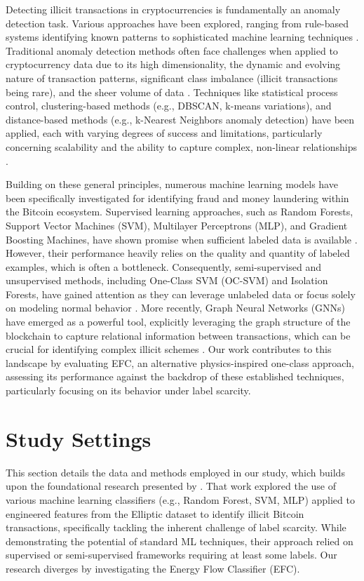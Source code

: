 \documentclass[12pt]{article}
\begin{document}
Detecting illicit transactions in cryptocurrencies is fundamentally an anomaly detection task. Various approaches have been 
explored, ranging from rule-based systems identifying known patterns to sophisticated machine learning techniques \cite{samariya2023comprehensive, li2023survey}.
Traditional anomaly detection methods often face challenges when applied to cryptocurrency data due to its high dimensionality,
the dynamic and evolving nature of transaction patterns, significant class imbalance (illicit transactions being rare), and
the sheer volume of data \cite{pallathadka2022cryptocurrency}. Techniques like statistical process control,
clustering-based methods (e.g., DBSCAN, k-means variations), and distance-based methods (e.g., k-Nearest Neighbors anomaly detection)
have been applied, each with varying degrees of success and limitations, particularly concerning scalability and the ability
to capture complex, non-linear relationships \cite{hilal2022financial}.

Building on these general principles, numerous machine learning models have been specifically investigated for identifying
fraud and money laundering within the Bitcoin ecosystem. Supervised learning approaches, such as Random Forests, Support
Vector Machines (SVM), Multilayer Perceptrons (MLP), and Gradient Boosting Machines, have shown promise when sufficient
labeled data is available \cite{lorenz2021machinelearningmethodsdetect, chen2021bitcoin}. However,
their performance heavily relies on the quality and quantity of labeled examples, which is often a bottleneck. Consequently,
semi-supervised and unsupervised methods, including One-Class SVM (OC-SVM) and Isolation Forests, have gained attention
as they can leverage unlabeled data or focus solely on modeling normal behavior \cite{lorenz2021machinelearningmethodsdetect,
kehinde2024machine}.
More recently, Graph Neural Networks (GNNs) have emerged as a powerful tool, explicitly leveraging the graph structure of
the blockchain to capture relational information between transactions, which can be crucial for identifying complex illicit
schemes \cite{weber2019antimoneylaunderingbitcoinexperimenting}. Our work contributes to this
landscape by evaluating EFC, an alternative physics-inspired one-class approach, assessing its performance against the
backdrop of these established techniques, particularly focusing on its behavior under label scarcity.


\section{Study Settings} \label{sec:methods}
This section details the data and methods employed in our study, which builds upon the foundational research presented
by \cite{lorenz2021machinelearningmethodsdetect}. That work explored the use of various machine learning classifiers
(e.g., Random Forest, SVM, MLP) applied to engineered features from the Elliptic dataset to identify illicit Bitcoin transactions,
specifically tackling the inherent challenge of label scarcity. While demonstrating the potential of standard ML techniques,
their approach relied on supervised or semi-supervised frameworks requiring at least some labels. Our research
diverges by investigating the Energy Flow Classifier (EFC). 
\end{document}
